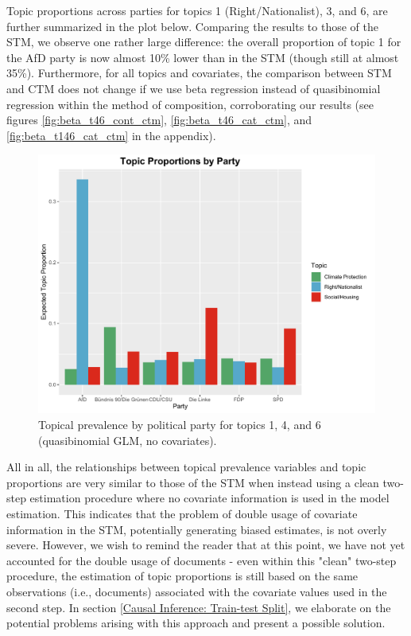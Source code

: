 Topic proportions across parties for topics 1 (Right/Nationalist), 3, and 6, are further summarized in the plot below. Comparing the results to those of the STM, we observe one rather large difference: the overall proportion of topic 1 for the AfD party is now almost 10\% lower than in the STM (though still at almost 35\%). Furthermore, for all topics and covariates, the comparison between STM and CTM does not change if we use beta regression instead of quasibinomial regression within the method of composition, corroborating our results (see figures \ref{fig:beta_t46_cont_ctm}, \ref{fig:beta_t46_cat_ctm}, and \ref{fig:beta_t146_cat_ctm} in the appendix).

\begin{figure}[h!]
  \centering
  \captionsetup{justification=centering,margin=2cm}
  \includegraphics[scale=0.5]{../plots/6_1/quasi_t146_cat_ctm.pdf}
  \caption{Topical prevalence by political party for topics 1, 4, and 6 (quasibinomial GLM, no covariates).}
  \label{fig:quasi_t146_cat_ctm}
\end{figure}

All in all, the relationships between topical prevalence variables and topic proportions are very similar to those of the STM when instead using a clean two-step estimation procedure where no covariate information is used in the model estimation. This indicates that the problem of double usage of covariate information in the STM, potentially generating biased estimates, is not overly severe. However, we wish to remind the reader that at this point, we have not yet accounted for the double usage of documents - even within this "clean" two-step procedure, the estimation of topic proportions is still based on the same observations (i.e., documents) associated with the covariate values used in the second step. In section \ref{Causal Inference: Train-test Split}, we elaborate on the potential problems arising with this approach and present a possible solution.